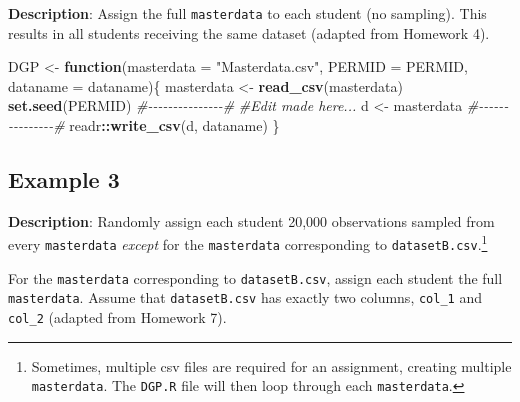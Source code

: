 \documentclass[
  12pt,
]{book}
\newenvironment{Shaded}{\begin{snugshade}}{\end{snugshade}}
\newcommand{\AttributeTok}[1]{\textcolor[rgb]{0.13,0.29,0.53}{#1}}
\newcommand{\CommentTok}[1]{\textcolor[rgb]{0.56,0.35,0.01}{\textit{#1}}}
\newcommand{\ControlFlowTok}[1]{\textcolor[rgb]{0.13,0.29,0.53}{\textbf{#1}}}
\newcommand{\FunctionTok}[1]{\textcolor[rgb]{0.13,0.29,0.53}{\textbf{#1}}}
\newcommand{\NormalTok}[1]{#1}
\newcommand{\OtherTok}[1]{\textcolor[rgb]{0.56,0.35,0.01}{#1}}
\newcommand{\SpecialCharTok}[1]{\textcolor[rgb]{0.81,0.36,0.00}{\textbf{#1}}}
\newcommand{\StringTok}[1]{\textcolor[rgb]{0.31,0.60,0.02}{#1}}
\begin{document}
\textbf{Description}: Assign the full \texttt{masterdata} to each student (no sampling). This results in all students receiving the same dataset (adapted from Homework 4).

\begin{Shaded}
\begin{Highlighting}[]
\NormalTok{DGP }\OtherTok{\textless{}{-}} \ControlFlowTok{function}\NormalTok{(}\AttributeTok{masterdata =} \StringTok{"Masterdata.csv"}\NormalTok{, }\AttributeTok{PERMID =}\NormalTok{ PERMID, }\AttributeTok{dataname =}\NormalTok{ dataname)\{}
\NormalTok{  masterdata }\OtherTok{\textless{}{-}} \FunctionTok{read\_csv}\NormalTok{(masterdata)}
  \FunctionTok{set.seed}\NormalTok{(PERMID)}
  \CommentTok{\#{-}{-}{-}{-}{-}{-}{-}{-}{-}{-}{-}{-}{-}{-}{-}\#}
  \CommentTok{\#Edit made here... }
\NormalTok{  d }\OtherTok{\textless{}{-}}\NormalTok{ masterdata}
  \CommentTok{\#{-}{-}{-}{-}{-}{-}{-}{-}{-}{-}{-}{-}{-}{-}{-}\#}
\NormalTok{  readr}\SpecialCharTok{::}\FunctionTok{write\_csv}\NormalTok{(d, dataname)}
\NormalTok{\}}
\end{Highlighting}
\end{Shaded}

\subsection*{Example 3}\label{example-3-1}

\textbf{Description}: Randomly assign each student 20,000 observations sampled from every \texttt{masterdata} \emph{except} for the \texttt{masterdata} corresponding to \texttt{datasetB.csv}.\footnote{Sometimes, multiple csv files are required for an assignment, creating multiple \texttt{masterdata}. The \texttt{DGP.R} file will then loop through each \texttt{masterdata}.}

For the \texttt{masterdata} corresponding to \texttt{datasetB.csv}, assign each student the full \texttt{masterdata}. Assume that \texttt{datasetB.csv} has exactly two columns, \texttt{col\_1} and \texttt{col\_2} (adapted from Homework 7).
\end{document}
